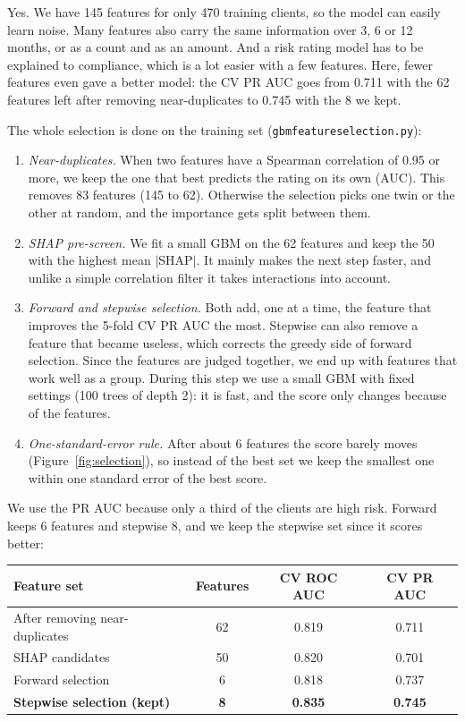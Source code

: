 \documentclass[12pt]{article}
\renewcommand{\_}{\textunderscore\allowbreak}
\begin{document}
Yes. We have 145 features for only 470 training clients, so the model can easily learn noise. Many features also carry the same information over 3, 6 or 12 months, or as a count and as an amount. And a risk rating model has to be explained to compliance, which is a lot easier with a few features. Here, fewer features even gave a better model: the CV PR AUC goes from 0.711 with the 62 features left after removing near-duplicates to 0.745 with the 8 we kept.

The whole selection is done on the training set (\texttt{gbm\_feature\_selection.py}):
\begin{enumerate}[nosep]
    \item \textit{Near-duplicates.} When two features have a Spearman correlation of 0.95 or more, we keep the one that best predicts the rating on its own (AUC). This removes 83 features (145 to 62). Otherwise the selection picks one twin or the other at random, and the importance gets split between them.
    \item \textit{SHAP pre-screen.} We fit a small GBM on the 62 features and keep the 50 with the highest mean $|$SHAP$|$. It mainly makes the next step faster, and unlike a simple correlation filter it takes interactions into account.
    \item \textit{Forward and stepwise selection.} Both add, one at a time, the feature that improves the 5-fold CV PR AUC the most. Stepwise can also remove a feature that became useless, which corrects the greedy side of forward selection. Since the features are judged together, we end up with features that work well as a group. During this step we use a small GBM with fixed settings (100 trees of depth 2): it is fast, and the score only changes because of the features.
    \item \textit{One-standard-error rule.} After about 6 features the score barely moves (Figure~\ref{fig:selection}), so instead of the best set we keep the smallest one within one standard error of the best score.
\end{enumerate}

We use the PR AUC because only a third of the clients are high risk. Forward keeps 6 features and stepwise 8, and we keep the stepwise set since it scores better:

\begin{center}
\begin{tabular}{lccc}
    \hline
    Feature set & Features & CV ROC AUC & CV PR AUC \\
    \hline
    After removing near-duplicates & 62 & 0.819 & 0.711 \\
    SHAP candidates & 50 & 0.820 & 0.701 \\
    Forward selection & 6 & 0.818 & 0.737 \\
    \textbf{Stepwise selection (kept)} & \textbf{8} & \textbf{0.835} & \textbf{0.745} \\
    \hline
\end{tabular}
\end{center}
\end{document}
